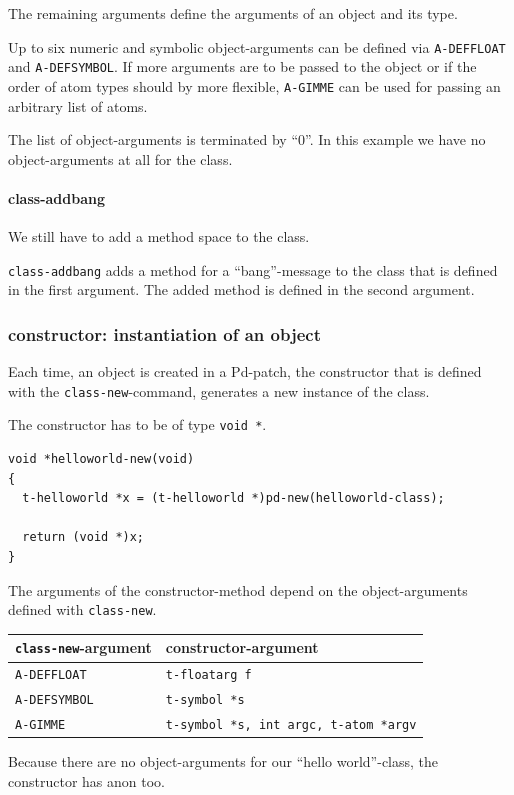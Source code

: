 \documentclass[draft]{ppgmus}
\begin{document}
The remaining arguments define the arguments of an object and its type.

Up to six numeric and symbolic object-arguments can be defined via
\verb+A-DEFFLOAT+ and \verb+A-DEFSYMBOL+.
If more arguments are to be passed to the object
or if the order of atom types should by more flexible, 
\verb+A-GIMME+ can be used for passing an arbitrary list of atoms.

The list of object-arguments is terminated by ``0''.
In this example we have no object-arguments at all for the class.

\paragraph{class-addbang}
We still have to add a method space to the class.

\verb+class-addbang+ adds a method for a ``bang''-message to the class that is
defined in the first argument.
The added method is defined in the second argument.


\subsubsection{constructor: instantiation of an object}
Each time, an object is created in a Pd-patch, the
constructor that is defined with the \verb+class-new+-command,
generates a new instance of the class.

The constructor has to be of type \verb+void *+.

\begin{verbatim}
void *helloworld-new(void)
{
  t-helloworld *x = (t-helloworld *)pd-new(helloworld-class);

  return (void *)x;
}
\end{verbatim}


The arguments of the constructor-method depend on the object-arguments
defined with \verb+class-new+.

\begin{tabular}{l|l}
\verb+class-new+-argument&constructor-argument\\
\hline
\verb+A-DEFFLOAT+&\verb+t-floatarg f+ \\
\verb+A-DEFSYMBOL+&\verb+t-symbol *s+ \\
\verb+A-GIMME+&\verb+t-symbol *s, int argc, t-atom *argv+
\end{tabular}

Because there are no object-arguments for our ``hello world''-class,
the constructor has anon too.
\end{document}
